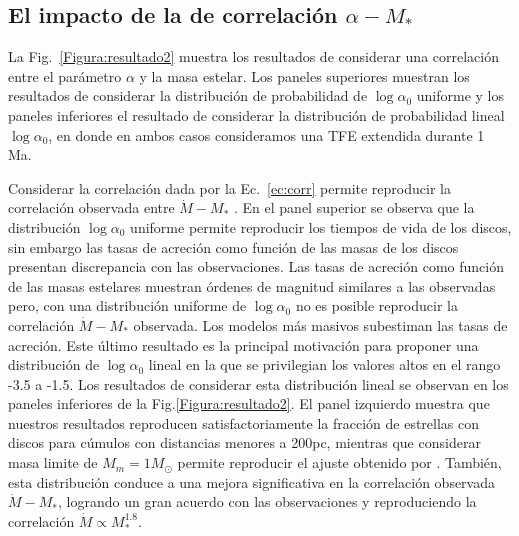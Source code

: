\documentclass[baaa]{baaa}
\begin{document}
\vspace{-.3cm}

\subsection{El impacto de la de correlación $\alpha - M_{*}$}

La Fig.~\ref{Figura:resultado2} muestra los resultados de considerar una correlación entre el parámetro $\alpha$ y la masa estelar. Los paneles superiores muestran los resultados de considerar la distribución de probabilidad de $\log\alpha_0$ uniforme y los paneles inferiores el resultado de considerar la distribución de probabilidad lineal $\log\alpha_0$, en donde en ambos casos consideramos una TFE extendida durante 1 Ma. 

Considerar la correlación dada por la Ec.~\ref{ec:corr} permite reproducir la correlación observada entre $\dot{M} - M_{*}$ \citep{manara2023ASPC}. En el panel superior se observa que la distribución $\log \alpha_0 $ uniforme permite reproducir los tiempos de vida de los discos, sin embargo las tasas de acreción como función de las masas de los discos presentan discrepancia con las observaciones. Las tasas de acreción como función de las masas estelares muestran órdenes de magnitud similares a las observadas pero, con una distribución uniforme de $\log\alpha_0$ no es posible reproducir la correlación  $\dot{M} - M_{*}$ observada. Los modelos más masivos subestiman las tasas de acreción. Este último resultado es la principal motivación para proponer una distribución de $\log \alpha_0$ lineal en la que se privilegian los valores altos en el rango -3.5 a -1.5. Los resultados de considerar esta distribución lineal se observan en los paneles inferiores de la Fig.\ref{Figura:resultado2}. El panel izquierdo muestra que nuestros resultados reproducen satisfactoriamente la fracción de estrellas con discos para cúmulos con distancias menores a 200pc, mientras que considerar masa limite de $M_{m}=1M_{\odot}$ permite reproducir el ajuste obtenido por \cite{MamajekE}. %
También, esta distribución conduce a una mejora significativa en la correlación observada $\dot{M}-M_*$, logrando un gran acuerdo con las observaciones y reproduciendo la correlación  $\dot{{M}}\propto {M}_{*}^{1.8}$.
\end{document}
